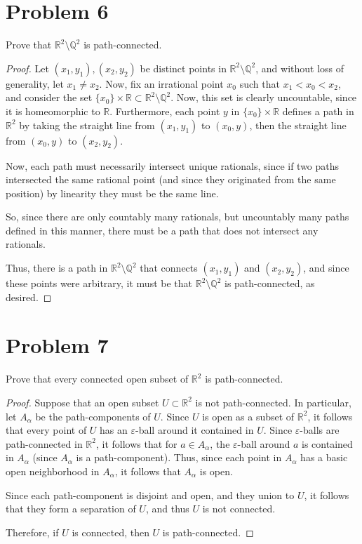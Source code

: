 \documentclass[fontsize=11pt]{scrartcl} %
\numberwithin{equation}{section} %
\numberwithin{figure}{section} %
\numberwithin{table}{section} %
\newcommand{\R}{\mathbb{R}}
\newcommand{\Q}{\mathbb{Q}}
\begin{document}
\section*{Problem 6}
Prove that $\R^2\setminus \Q^2$ is path-connected.
\\
\begin{proof}
    Let $(x_1,y_1),(x_2,y_2)$ be distinct points in $\R^2\setminus \Q^2$, and
    without loss of generality, let $x_1\neq x_2$. Now, fix an irrational point
    $x_0$ such that $x_1<x_0<x_2$, and consider the set $\{x_0\}\times \R\subset
    \R^2\setminus\Q^2$. Now, this set is clearly uncountable, since it is
    homeomorphic to $\R$. Furthermore, each point $y$ in $\{x_0\}\times \R$ defines
    a path in $\R^2$ by taking the straight line from $(x_1,y_1)$ to $(x_0,y)$,
    then the straight line from $(x_0,y)$ to $(x_2,y_2)$.

    Now, each path must necessarily intersect unique rationals, since if two
    paths intersected the same rational point (and since they originated from
    the same position) by linearity they must be the same line.

    So, since there are only countably many rationals, but uncountably many
    paths defined in this manner, there must be a path that does not intersect
    any rationals.

    Thus, there is a path in $\R^2\setminus \Q^2$ that connects $(x_1,y_1)$ and
    $(x_2,y_2)$, and since these points were arbitrary, it must be that
    $\R^2\setminus \Q^2$ is path-connected, as desired.
\end{proof}

\section*{Problem 7}
Prove that every connected open subset of $\R^2$ is path-connected.
\\
\begin{proof}
Suppose that an open subset $U\subset\R^2$ is not
    path-connected. In particular, let $A_{\alpha}$ be the path-components of
    $U$. Since $U$ is open as a subset of $\R^2$, it follows that every point of
    $U$ has an $\varepsilon$-ball around it contained in $U$. Since
    $\varepsilon$-balls are path-connected in $\R^2$, it follows that for $a\in
    A_{\alpha}$, the $\varepsilon$-ball around $a$ is contained in $A_{\alpha}$
    (since $A_{\alpha}$ is a path-component). Thus, since each point in
    $A_{\alpha}$ has a basic
    open neighborhood in $A_{\alpha}$, it follows that $A_{\alpha}$ is open.

    Since each path-component is disjoint and open, and they union to $U$, it
    follows that they form a separation of $U$, and thus $U$ is not connected.
    
    Therefore, if $U$ is connected, then $U$ is path-connected.
\end{proof}
\end{document}
